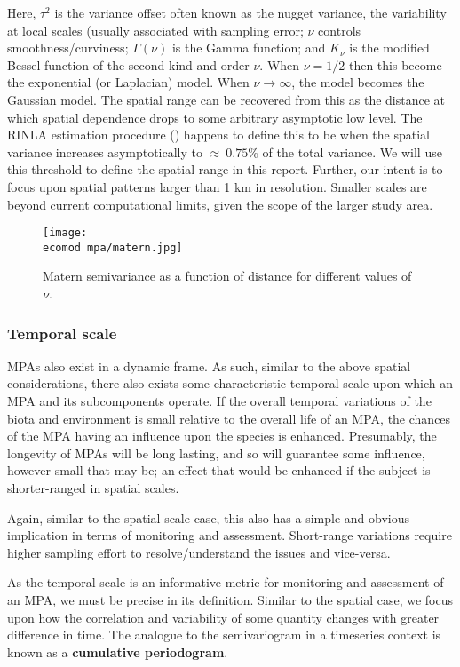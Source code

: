 \documentclass[letterpaper,portrait,11pt]{scrartcl}
\numberwithin{equation}{section}		%
\numberwithin{figure}{section}		%
\numberwithin{table}{section}				%
\newcommand{\ecomod}{\string~/ecomod_data/}   %
\begin{document}
Here, $\tau^2$ is the variance offset often known as the nugget variance, the variability at local scales (usually associated with sampling error; $\nu$ controls smoothness/curviness; $\Gamma(\nu)$ is the Gamma function; and $K_{\nu}$ is the modified Bessel function of the second kind and order $\nu$. When $\nu=1/2$ then this become the exponential (or Laplacian) model. When $\nu \longrightarrow \infty$, the model becomes the Gaussian model. The spatial range can be recovered from this as the distance at which spatial dependence drops to some arbitrary asymptotic low level. The RINLA estimation procedure (\cite{rinla}) happens to define this to be when the spatial variance increases asymptotically to $\approx~0.75\%$ of the total variance. We will use this threshold to define the spatial range in this report. Further, our intent is to focus upon spatial patterns larger than 1 km in resolution. Smaller scales are beyond current computational limits, given the scope of the larger study area.

\begin{figure}
  \centering
  \texttt{[image: \\ecomod mpa/matern.jpg]}
  \caption{Matern semivariance as a function of distance for different values of $\nu$.}
    \label{fig:matern}
\end{figure}


\subsubsection{Temporal scale}
\label{sec:interpolationTS}

MPAs also exist in a dynamic frame. As such, similar to the above spatial considerations, there also exists some characteristic temporal scale upon which an MPA and its subcomponents operate. If the overall temporal variations of the biota and environment is small relative to the overall life of an MPA, the chances of the MPA having an influence upon the species is enhanced. Presumably, the longevity of MPAs will be long lasting, and so will guarantee some influence, however small that may be; an effect that would be enhanced if the subject is shorter-ranged in spatial scales.

Again, similar to the spatial scale case, this also has a simple and obvious implication in terms of monitoring and assessment. Short-range variations require higher sampling effort to resolve/understand the issues and vice-versa.

As the temporal scale is an informative metric for monitoring and assessment of an MPA, we must be precise in its definition. Similar to the spatial case, we focus upon how the correlation and variability of some quantity changes with greater difference in time. The analogue to the semivariogram in a timeseries context is known as a \textbf{cumulative periodogram}. 
\end{document}
